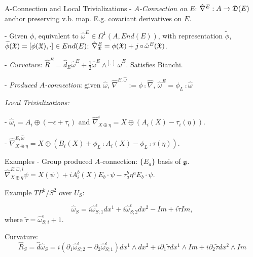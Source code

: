 \begin{frame}{A-Connection and Local Trivializations}
    - \emph{$A$-Connection on $E$}: $\hat \nabla^E: A \to \mathfrak{D}(E)$ anchor preserving v.b. map. E.g. covariant derivatives on $E$.
    
    - Given $\phi$, equivalent to $\hat \omega^E \in \Omega^1(A, End(E))$, with representation $\tilde \phi$, $\tilde \phi(\oid X) = [\phi(\oid X), \cdot] \in End(E)$: $\hat \nabla^E_{\oid X} = \phi(\oid X) + j\comp \hat \omega^E(\oid X)$.
    
    - \emph{Curvature}: $\hat R^E = \hat d_{E} \hat \omega^E + \frac{1}{2} \hat \omega^E \wedge^{[,]} \hat \omega^E$. Satisfies Bianchi.
    
    - \emph{Produced $A$-connection}: given $\hat \omega$, $\hat \nabla^{E, \hat \omega} := \phi \comp \hat \nabla$, $\hat \omega^E = \phi_L \comp \hat \omega$
    
    \textit{Local Trivializations:}
    
    - $\hat \omega_i = A_i \oplus (-\epsilon + \tau_i)$ and $\hat \nabla^i_{X \oplus \eta} = X \oplus (A_i(X) - \tau_i(\eta))$.
    
    - $\hat \nabla^{E, \hat \omega}_{X \oplus \eta} = X \oplus (B_i(X) + \phi_L \comp A_i(X) - \phi_L \comp \tau(\eta))$. 
    
\end{frame}



\begin{frame}{Examples}
    - Group produced $A$-connection: $\{E_a\}$ basis of $\mathfrak{g}$. $\hat \nabla^{E, \hat \omega, i}_{X \oplus \eta} \psi = X(\psi) + i A_i^b(X) E_b \cdot \psi - \tau^b_a \eta^a E_b \cdot \psi$.
    
    Example $TP^k/S^2$ over $U_S$:
    
    $$\hat \omega_S = i\hat \omega^\epsilon_{S; 1} dx^1 + i\hat \omega^\epsilon_{S; 2} dx^2 - Im + i \tilde \tau Im,$$ where $\tilde \tau = \hat \omega^\epsilon_{S; i} + 1$.
    
    Curvature:
    $$\hat R_S = \hat d \hat \omega_S 
        = i(\partial_{1} \hat \omega^\epsilon_{S;2} - \partial_{2} \hat \omega^\epsilon_{S; 1}) dx^1 \wedge dx^2 + i \partial_{1} \tilde \tau dx^1 \wedge Im +  i \partial_{2} \tilde \tau dx^2 \wedge Im$$
\end{frame}